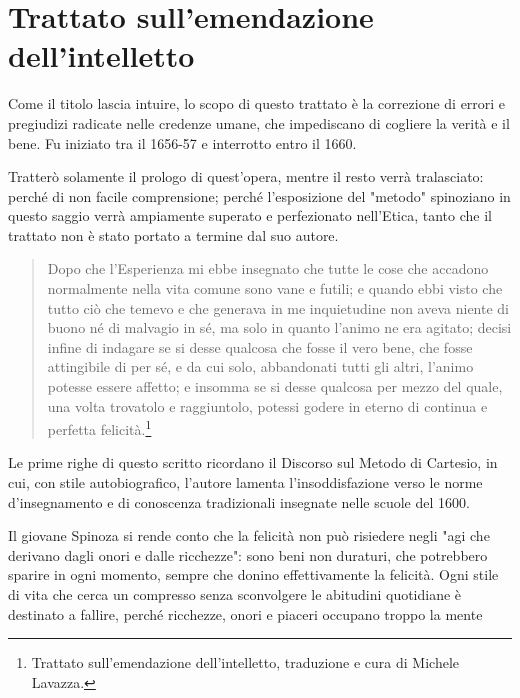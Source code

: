 \chapter{Trattato sull'emendazione dell'intelletto}

\bigskip
\bigskip
\bigskip

Come il titolo lascia intuire, lo scopo di questo trattato è la correzione di errori e pregiudizi radicate nelle credenze umane, che impediscano di cogliere la verità e il bene. Fu iniziato tra il 1656-57 e interrotto entro il 1660.

Tratterò solamente il prologo di quest'opera, mentre il resto verrà tralasciato: perché di non facile comprensione; perché l'esposizione del "metodo" spinoziano in questo saggio verrà ampiamente superato  e perfezionato nell'Etica, tanto che il trattato non è stato portato a termine dal suo autore.

\begin{quotation}
	\small Dopo che l'Esperienza mi ebbe insegnato che tutte le cose che accadono normalmente nella vita
	comune sono vane e futili; e quando ebbi visto che tutto ciò che temevo e che generava in me
	inquietudine non aveva niente di buono né di malvagio in sé, ma solo in quanto l'animo ne era
	agitato; decisi infine di indagare se si desse qualcosa che fosse il vero bene, che fosse attingibile di
	per sé, e da cui solo, abbandonati tutti gli altri, l'animo potesse essere affetto; e insomma se si desse
	qualcosa per mezzo del quale, una volta trovatolo e raggiuntolo, potessi godere in eterno di continua
	e perfetta felicità.\footnote{Trattato sull'emendazione dell'intelletto, traduzione e cura di Michele Lavazza.}
\end{quotation}

Le prime righe di questo scritto ricordano il Discorso sul Metodo di Cartesio, in cui, con stile autobiografico, l'autore lamenta l'insoddisfazione verso le norme d'insegnamento e di conoscenza tradizionali insegnate nelle scuole del 1600.

Il giovane Spinoza si rende conto che la felicità non può risiedere negli "agi che derivano dagli
onori e dalle ricchezze": sono beni non duraturi, che potrebbero sparire in ogni momento, sempre che donino effettivamente la felicità. Ogni stile di vita che cerca un compresso senza sconvolgere le abitudini quotidiane è destinato a fallire, perché ricchezze, onori e piaceri occupano troppo la mente

